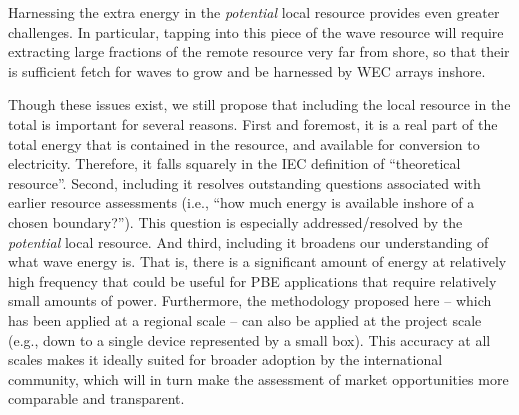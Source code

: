 Harnessing the extra energy in the {\em potential} local resource provides even greater challenges. In particular, tapping into this piece of the wave resource will require extracting large fractions of the remote resource very far from shore, so that their is sufficient fetch for waves to grow and be harnessed by WEC arrays inshore.  

Though these issues exist, we still propose that including the local resource in the total is important for several reasons. First and foremost, it is a real part of the total energy that is contained in the resource, and available for conversion to electricity. Therefore, it falls squarely in the IEC definition of ``theoretical resource''. Second, including it resolves outstanding questions associated with earlier resource assessments (i.e., ``how much energy is available inshore of a chosen boundary?''). This question is especially addressed/resolved by the {\em potential} local resource. And third, including it broadens our understanding of what wave energy is. That is, there is a significant amount of energy at relatively high frequency that could be useful for PBE applications that require relatively small amounts of power. Furthermore, the methodology proposed here -- which has been applied at a regional scale -- can also be applied at the project scale (e.g., down to a single device represented by a small box).
This accuracy at all scales makes it ideally suited for broader adoption by the international community, which will in turn make the assessment of market opportunities more comparable and transparent.

